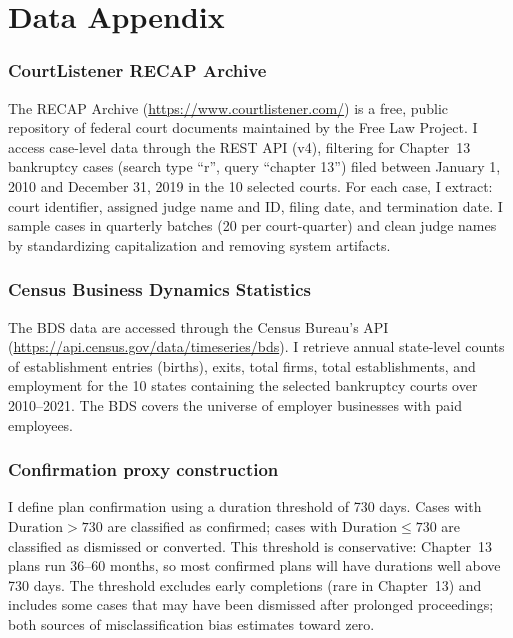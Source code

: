 \documentclass[12pt]{article}
\begin{document}
\label{apep_main_text_end}
\newpage


\newpage
\appendix

\section{Data Appendix}

\subsubsection*{CourtListener RECAP Archive} The RECAP Archive (\url{https://www.courtlistener.com/}) is a free, public repository of federal court documents maintained by the Free Law Project. I access case-level data through the REST API (v4), filtering for Chapter~13 bankruptcy cases (search type ``r'', query ``chapter 13'') filed between January 1, 2010 and December 31, 2019 in the 10 selected courts. For each case, I extract: court identifier, assigned judge name and ID, filing date, and termination date. I sample cases in quarterly batches (20 per court-quarter) and clean judge names by standardizing capitalization and removing system artifacts.

\subsubsection*{Census Business Dynamics Statistics} The BDS data are accessed through the Census Bureau's API (\url{https://api.census.gov/data/timeseries/bds}). I retrieve annual state-level counts of establishment entries (births), exits, total firms, total establishments, and employment for the 10 states containing the selected bankruptcy courts over 2010--2021. The BDS covers the universe of employer businesses with paid employees.

\subsubsection*{Confirmation proxy construction} I define plan confirmation using a duration threshold of 730 days. Cases with $\text{Duration} > 730$ are classified as confirmed; cases with $\text{Duration} \leq 730$ are classified as dismissed or converted. This threshold is conservative: Chapter~13 plans run 36--60 months, so most confirmed plans will have durations well above 730 days. The threshold excludes early completions (rare in Chapter~13) and includes some cases that may have been dismissed after prolonged proceedings; both sources of misclassification bias estimates toward zero.
\end{document}
